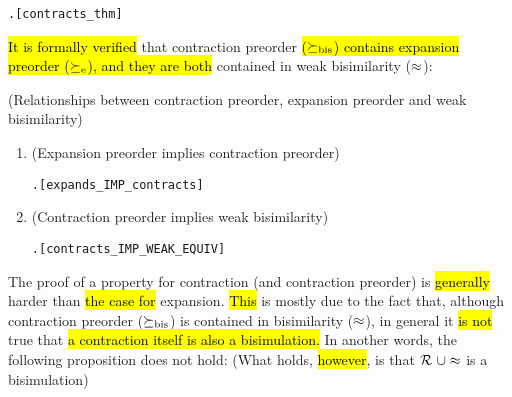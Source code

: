 \begin{alltt}
\HOLTokenTurnstile{}  \HOLSymConst{\HOLTokenContracts{}}  \HOLSymConst{\HOLTokenEquiv{}} \HOLSymConst{\HOLTokenExists{}}.    \HOLSymConst{\HOLTokenConj{}}  \hfill{[contracts_thm]}
\end{alltt}

\hl{It is formally verified} that contraction preorder
\hl{($\mathrel{\succeq_{\rm{bis}}}$) contains expansion
preorder ($\mathrel{\succeq_{\rm{e}}}$), and they are both}
contained in weak bisimilarity ($\approx$):
\begin{proposition}{(Relationships between contraction preorder,
    expansion preorder and weak bisimilarity)}
\begin{enumerate}
\item (Expansion preorder implies contraction preorder)
\begin{alltt}
\HOLTokenTurnstile{} \HOLSymConst{\HOLTokenForall{}} .  \HOLSymConst{\HOLTokenExpands{}}  \HOLSymConst{\HOLTokenImp{}}  \HOLSymConst{\HOLTokenContracts{}} \hfill[expands_IMP_contracts]
\end{alltt}
\item (Contraction preorder implies weak bisimilarity)
\begin{alltt}
\HOLTokenTurnstile{} \HOLSymConst{\HOLTokenForall{}} .  \HOLSymConst{\HOLTokenContracts{}}  \HOLSymConst{\HOLTokenImp{}}  \HOLSymConst{\HOLTokenWeakEQ} \hfill[contracts_IMP_WEAK_EQUIV]
\end{alltt}
\end{enumerate}
\end{proposition}
The proof of a property for contraction (and contraction preorder) is
\hl{generally} harder than \hl{the case for} expansion. \hl{This} is mostly due to the fact
  that, although contraction preorder ($\mathrel{\succeq_{\rm{bis}}}$) is contained in
  bisimilarity ($\approx$), in general it \hl{is not} true that \hl{a
  contraction itself is also a bisimulation.} In another words,
  the following proposition does not hold: (What holds, \hl{however}, is that ${\cal R}\ \cup \approx$ is a bisimulation)
\begin{alltt}
\end{alltt}
